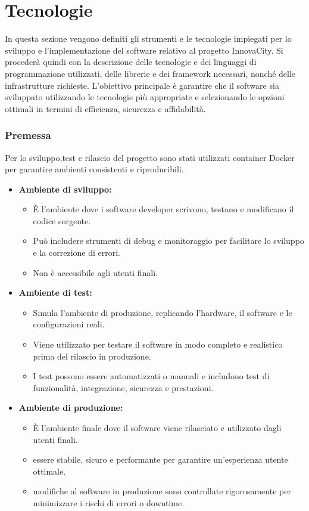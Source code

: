 \section{Tecnologie}
In questa sezione vengono definiti gli strumenti e le tecnologie impiegati per lo sviluppo e l'implementazione del software relativo al progetto InnovaCity. Si procederà quindi con la descrizione delle tecnologie e dei linguaggi di programmazione utilizzati, delle librerie e dei framework necessari, nonché delle infrastrutture richieste. L'obiettivo principale è garantire che il software sia sviluppato utilizzando le tecnologie più appropriate e selezionando le opzioni ottimali in termini di efficienza, sicurezza e affidabilità.
\subsubsection*{Premessa}
Per lo sviluppo,test e rilascio del progetto sono stati utilizzati container Docker per garantire ambienti consistenti e riproducibili.
\begin{itemize}
  \item \textbf{Ambiente di sviluppo:}
    \begin{itemize}
      \item È l'ambiente dove i software developer scrivono, testano e modificano il codice sorgente.
      \item Può includere strumenti di debug e monitoraggio per facilitare lo sviluppo e la correzione di errori.
      \item Non è accessibile agli utenti finali.
    \end{itemize}
    \item \textbf{Ambiente di test:}
    \begin{itemize}
      \item Simula l'ambiente di produzione, replicando l'hardware, il software e le configurazioni reali.
      \item Viene utilizzato per testare il software in modo completo e realistico prima del rilascio in produzione.
      \item I test possono essere automatizzati o manuali e includono test di funzionalità, integrazione, sicurezza e prestazioni.
    \end{itemize}
    \item \textbf{Ambiente di produzione:}
    \begin{itemize}
      \item È l'ambiente finale dove il software viene rilasciato e utilizzato dagli utenti finali.
      \item essere stabile, sicuro e performante per garantire un'esperienza utente ottimale.
      \item modifiche al software in produzione sono controllate rigorosamente per minimizzare i rischi di errori o downtime.
    \end{itemize}
\end{itemize}



